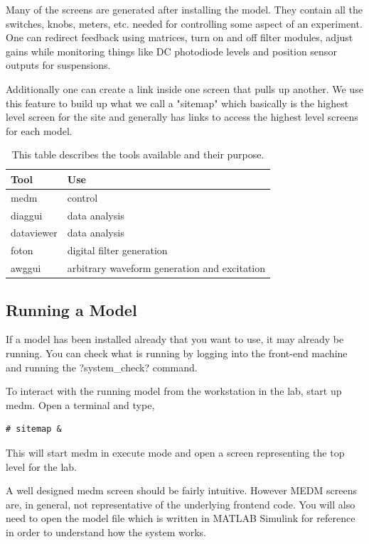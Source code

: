 Many of the screens are generated after installing the model. They contain all
the switches, knobs, meters, etc. needed for controlling some aspect of an
experiment. One can redirect feedback using matrices, turn on and off filter
modules, adjust gains while monitoring things like DC photodiode levels and
position sensor outputs for suspensions.

Additionally one can create a link inside one screen that pulls up another. We
use this feature to build up what we call a "sitemap" which basically is the
highest level screen for the site and generally has links to access the
highest level screens for each model.

\begin{table}
\begin{center}
\begin{tabular}{ | l | l | }
\hline
Tool & Use \\
\hline
medm & control \\
diaggui & data analysis \\
dataviewer & data analysis \\
foton & digital filter generation \\
awggui & arbitrary waveform generation and excitation \\
\hline
\end{tabular}
\end{center}
\caption[Front-End Tools]{This table describes the tools available and their
purpose.
}
\label{table:fetools}
\end{table}

\subsection{Running a Model}

If a model has been installed already that you want to use, it may already be
running. You can check what is running by logging into the front-end machine
and running the \lstin?system_check? command.

To interact with the running model from the workstation in the lab, start up
medm. Open a terminal and type,
\begin{lstlisting}
# sitemap &
\end{lstlisting}
This will start medm in execute mode and open a screen representing the top
level for the lab.

A well designed medm screen should be fairly intuitive. However MEDM
screens are, in general, not representative of the underlying frontend
code. You will also need to open the model file which is written in MATLAB
Simulink for reference in order to understand how the system works.



